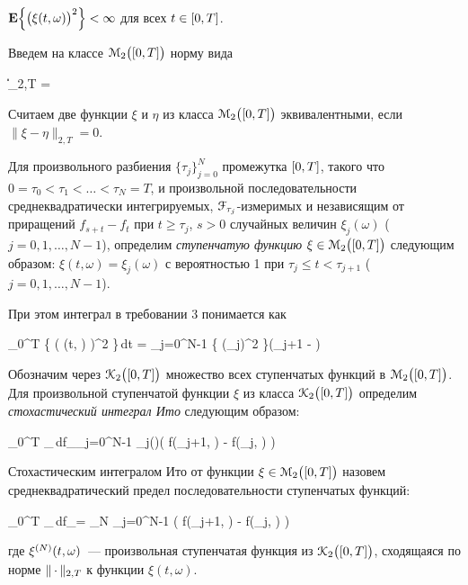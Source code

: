 	\item
		$\mathbf{E} \Bigl\{ \bigl( \xi(t, \omega) \bigr)^2 \Bigr\} < \infty$ для всех $t \in [0, T]$.
\eenum

Введем на классе $\mathcal{M}_2\bigl( [0, T] \bigr)$ норму вида

\beqn
	\| \xi \|_{2,T} =  
\eeqn

Считаем две функции $\xi$ и $\eta$ из класса $\mathcal{M}_2\bigl( [0, T] \bigr)$ эквивалентными, если $\| \xi - \eta \|_{2,T} = 0$.

Для произвольного разбиения $\{ \tau_j \}_{j=0}^N$ промежутка $[0, T]$, такого что $0 = \tau_0 < \tau_1 < \ldots < \tau_N = T$, и произвольной последовательности среднеквадратически интегрируемых, $\mathcal{F}_{\tau_j}$-измеримых и независящим от приращений $f_{s+t} - f_t$ при $t \geqslant \tau_j$, $s > 0$ случайных величин $\xi_j(\omega)$ ($j = 0, 1, \ldots, N-1$), определим \emph{ступенчатую функцию} $\xi \in \mathcal{M}_2\bigl( [0, T] \bigr)$ следующим образом: $\xi(t, \omega) = \xi_j(\omega)$ с вероятностью 1 при $\tau_j \leqslant t < \tau_{j+1}$ ($j = 0, 1, \ldots, N-1$).

При этом интеграл в требовании 3 понимается как

\beqn
	\int\limits_0^T \E \Bigl\{ \bigl( \xi(t, \omega) \bigr)^2 \Bigr\}\,dt = \sum\limits_{j=0}^{N-1} \E \bigl\{ (\xi_j)^2 \bigr\}(\tau_{j+1} - ) 
\eeqn

Обозначим через $\mathcal{K}_2\bigl( [0, T] \bigr)$ множество всех ступенчатых функций в $\mathcal{M}_2\bigl( [0, T] \bigr)$. Для произвольной ступенчатой функции $\xi$ из класса $\mathcal{K}_2\bigl( [0, T] \bigr)$ определим \emph{стохастический интеграл Ито} следующим образом:

\beqn
	\int\limits_0^T \xi_\tau\,df_\tau \eqdef \sum\limits_{j=0}^{N-1} \xi_j(\omega)\bigl( f(\tau_{j+1}, \omega) - f(\tau_j, \omega) \bigr) 
\eeqn

\begin{df}
	Стохастическим интегралом Ито от функции $\xi \in \mathcal{M}_2\bigl( [0, T] \bigr)$ назовем среднеквадратический предел последовательности ступенчатых функций:
	
	\beqn
		\int\limits_0^T \xi_\tau\,df_\tau = \lim\limits_{N \to \infty} \sum\limits_{j=0}^{N-1} \xi{}\bigl( f(\tau{}_{j+1}, \omega) - f(\tau{}_j, \omega) \bigr) \text{,} 
	\eeqn
	
	где $\xi^{(N)}(t, \omega)$~--- произвольная ступенчатая функция из $\mathcal{K}_2\bigl( [0, T] \bigr)$, сходящаяся по норме $\| \,\cdotp \|_{2,T}$ к функции $\xi(t, \omega)$.
\end{df}

